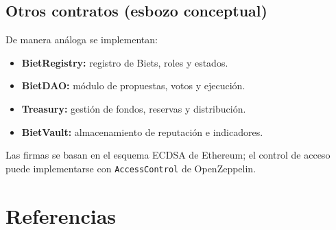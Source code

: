 \documentclass[12pt]{report}
\begin{document}
\section{Otros contratos (esbozo conceptual)}
De manera análoga se implementan:
\begin{itemize}
    \item \textbf{BietRegistry:} registro de Biets, roles y estados.
    \item \textbf{BietDAO:} módulo de propuestas, votos y ejecución.
    \item \textbf{Treasury:} gestión de fondos, reservas y distribución.
    \item \textbf{BietVault:} almacenamiento de reputación e indicadores.
\end{itemize}

Las firmas se basan en el esquema ECDSA de Ethereum; el control de acceso puede implementarse con \texttt{AccessControl} de OpenZeppelin.

\chapter*{Referencias}
\end{document}
